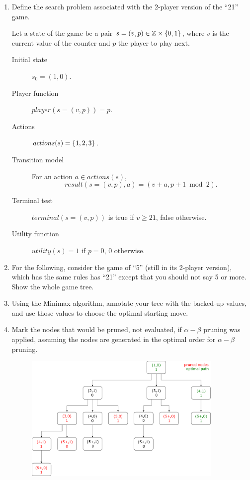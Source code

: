 \documentclass[11pt, a4paper]{article}
\begin{document}
\begin{enumerate}
    \item Define the search problem associated with the 2-player version of the \enquote{21} game.

    \begin{solution}
        Let a state of the game be a pair $s = (v, p) \in \mathbb{Z} \times \{0, 1\}$, where $v$ is the current value of the counter and $p$ the player to play next.
        \begin{description}
            \item[Initial state] $s_0 = (1, 0)$.
            \item[Player function] $player(s = (v, p)) = p$.
            \item[Actions] $actions(s) = \{1, 2, 3\}$.
            \item[Transition model] For an action $a \in actions(s)$, $$result(s = (v, p), a) = (v + a,  p + 1 \bmod 2).$$
            \item[Terminal test] $terminal(s = (v, p))$ is true if $v \geq 21$, false otherwise.
            \item[Utility function] $utility(s) = 1$ if $p = 0$, $0$ otherwise.
        \end{description}
    \end{solution}

    \item For the following, consider the game of \enquote{5} (still in its 2-player version), which has the same rules has \enquote{21} except that you should not say 5 or more. Show the whole game tree.
    \item Using the Minimax algorithm, annotate your tree with the backed-up values, and use those values to choose the optimal starting move.
    \item Mark the nodes that would be pruned, \ie{} not evaluated, if $\alpha - \beta$ pruning was applied, assuming the nodes are generated in the optimal order for $\alpha - \beta$ pruning.

    \begin{solution}
        \begin{figure}[H]
            \centering
            \includegraphics[width=0.9\textwidth]{figures/e2_21.pdf}
        \end{figure}
    \end{solution}
\end{enumerate}
\end{document}
